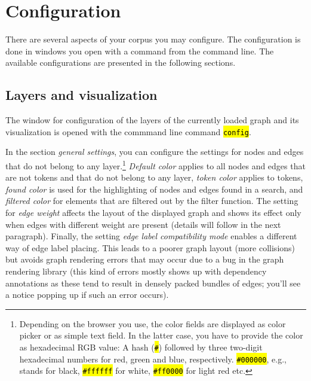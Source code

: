 \documentclass[12pt]{scrartcl}
\newcommand{\code}[1]{\hl{\texttt{#1}}}
\begin{document}
\section{Configuration}\label{konfiguration}

There are several aspects of your corpus you may configure. The configuration is done in windows you open with a command from the command line. The available configurations are presented in the following sections.

\subsection{Layers and visualization}\label{ebenenkonfiguration}

The window for configuration of the layers of the currently loaded graph and its visualization is opened with the commmand line command \code{config}.

In the section \textit{general settings}, you can configure the settings for nodes and edges that do not belong to any layer.\footnote{Depending on the browser you use, the color fields are displayed as color picker or as simple text field. In the latter case, you have to provide the color as hexadecimal RGB value: A hash (\code{\#}) followed by three two-digit hexadecimal numbers for red, green and blue, respectively. \code{\#000000}, e.g., stands for black, \code{\#ffffff} for white, \code{\#ff0000} for light red etc.}
\textit{Default color} applies to all nodes and edges that are not tokens and that do not belong to any layer, \textit{token color} applies to tokens, \textit{found color} is used for the highlighting of nodes and edges found in a search, and \textit{filtered color} for elements that are filtered out by the filter function.
The setting for \textit{edge weight} affects the layout of the displayed graph and shows its effect only when edges with different weight are present (details will follow in the next paragraph).
Finally, the setting \textit{edge label compatibility mode} enables a different way of edge label placing.
This leads to a poorer graph layout (more collisions) but avoids graph rendering errors that may occur due to a bug in the graph rendering library (this kind of errors mostly shows up with dependency annotations as these tend to result in densely packed bundles of edges; you’ll see a notice popping up if such an error occurs).
\end{document}
